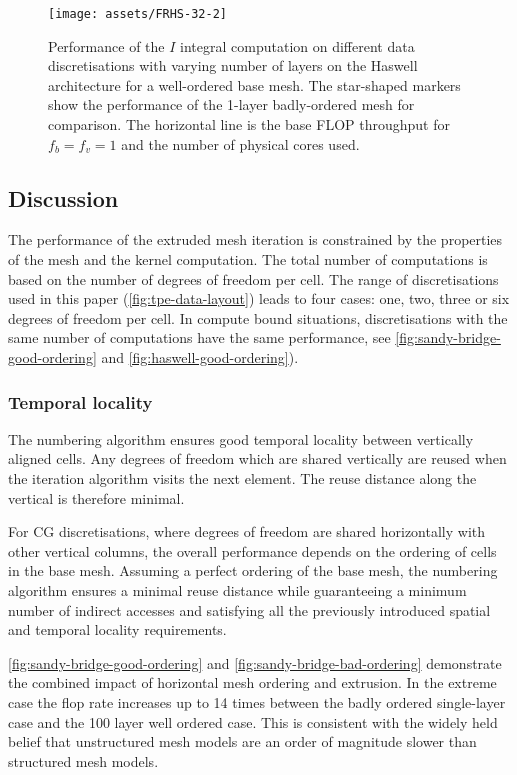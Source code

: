\documentclass[11pt, a4paper]{scrartcl}
\begin{document}
\begin{figure}
  \centering
  \texttt{[image: assets/FRHS-32-2]}
  \caption{Performance of the $I$ integral computation on different
    data discretisations with varying number of layers on the Haswell
    architecture for a well-ordered base mesh. The star-shaped markers
    show the performance of the 1-layer badly-ordered mesh for
    comparison.  The horizontal line is the base FLOP throughput for
    $f_b = f_v = 1$ and the number of physical cores
    used.}
  \label{fig:haswell-good-ordering}
\end{figure}

\subsection{Discussion}
\label{ssec:discussion}

The performance of the extruded mesh iteration is constrained by the
properties of the mesh and the kernel computation.  The total number
of computations is based on the number of degrees of freedom per
cell. The range of discretisations used in this paper
(\autoref{fig:tpe-data-layout}) leads to four cases: one, two, three
or six degrees of freedom per cell. In compute bound situations,
discretisations with the same number of computations have the same
performance, see \autoref{fig:sandy-bridge-good-ordering} and
\autoref{fig:haswell-good-ordering}).

\subsubsection{Temporal locality}
\label{sssec:temporal-locality}
The numbering algorithm ensures good temporal locality between
vertically aligned cells. Any degrees of freedom which are shared
vertically are reused when the iteration algorithm visits the next
element. The reuse distance along the vertical is therefore minimal.

For $\mathrm{CG}$ discretisations, where degrees of freedom are shared
horizontally with other vertical columns, the overall performance
depends on the ordering of cells in the base mesh. Assuming a perfect
ordering of the base mesh, the numbering algorithm ensures a minimal
reuse distance while guaranteeing a minimum number of indirect
accesses and satisfying all the previously introduced spatial and
temporal locality requirements.

\autoref{fig:sandy-bridge-good-ordering} and
\autoref{fig:sandy-bridge-bad-ordering} demonstrate the combined
impact of horizontal mesh ordering and extrusion. In the extreme case
the flop rate increases up to 14 times between the badly ordered
single-layer case and the 100 layer well ordered case. This is
consistent with the widely held belief that unstructured mesh models
are an order of magnitude slower than structured mesh models.
\end{document}
